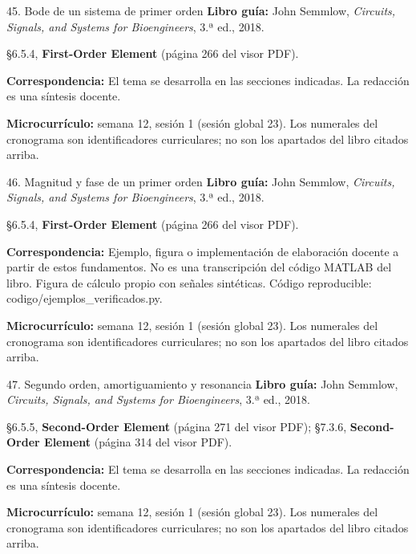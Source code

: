 \documentclass[
  10pt,
  ignorenonframetext,
  aspectratio=169,
  spanish,
]{beamer}
\begin{document}
\begin{frame}{45. Bode de un sistema de primer orden}
\label{bode-de-un-sistema-de-primer-orden}
\textbf{Libro guía:} John Semmlow, \emph{Circuits, Signals, and Systems
for Bioengineers}, 3.ª ed., 2018.

§6.5.4, \textbf{First-Order Element} (página 266 del visor PDF).

\textbf{Correspondencia:} El tema se desarrolla en las secciones
indicadas. La redacción es una síntesis docente.

\textbf{Microcurrículo:} semana 12, sesión 1 (sesión global 23). Los
numerales del cronograma son identificadores curriculares; no son los
apartados del libro citados arriba.
\end{frame}

\begin{frame}{46. Magnitud y fase de un primer orden}
\label{magnitud-y-fase-de-un-primer-orden}
\textbf{Libro guía:} John Semmlow, \emph{Circuits, Signals, and Systems
for Bioengineers}, 3.ª ed., 2018.

§6.5.4, \textbf{First-Order Element} (página 266 del visor PDF).

\textbf{Correspondencia:} Ejemplo, figura o implementación de
elaboración docente a partir de estos fundamentos. No es una
transcripción del código MATLAB del libro. Figura de cálculo propio con
señales sintéticas. Código reproducible:
codigo/ejemplos\_verificados.py.

\textbf{Microcurrículo:} semana 12, sesión 1 (sesión global 23). Los
numerales del cronograma son identificadores curriculares; no son los
apartados del libro citados arriba.
\end{frame}

\begin{frame}{47. Segundo orden, amortiguamiento y resonancia}
\label{segundo-orden-amortiguamiento-y-resonancia}
\textbf{Libro guía:} John Semmlow, \emph{Circuits, Signals, and Systems
for Bioengineers}, 3.ª ed., 2018.

§6.5.5, \textbf{Second-Order Element} (página 271 del visor PDF);
§7.3.6, \textbf{Second-Order Element} (página 314 del visor PDF).

\textbf{Correspondencia:} El tema se desarrolla en las secciones
indicadas. La redacción es una síntesis docente.

\textbf{Microcurrículo:} semana 12, sesión 1 (sesión global 23). Los
numerales del cronograma son identificadores curriculares; no son los
apartados del libro citados arriba.
\end{frame}
\end{document}
